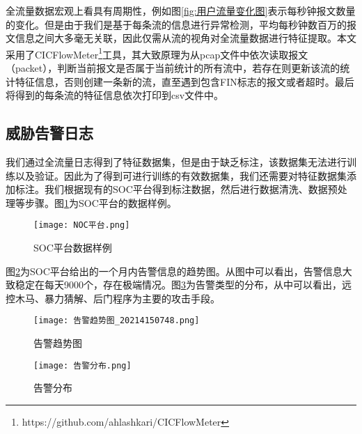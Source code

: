 全流量数据宏观上看具有周期性，例如图\ref{fig:用户流量变化图}表示每秒钟报文数量的变化。但是由于我们是基于每条流的信息进行异常检测，平均每秒钟数百万的报文信息之间大多毫无关联，因此仅需从流的视角对全流量数据进行特征提取。本文采用了CICFlowMeter\footnote{https://github.com/ahlashkari/CICFlowMeter}工具，其大致原理为从pcap文件中依次读取报文（packet），判断当前报文是否属于当前统计的所有流中，若存在则更新该流的统计特征信息，否则创建一条新的流，直至遇到包含FIN标志的报文或者超时。最后将得到的每条流的特征信息依次打印到csv文件中。


\subsection{威胁告警日志}
我们通过全流量日志得到了特征数据集，但是由于缺乏标注，该数据集无法进行训练以及验证。因此为了得到可进行训练的有效数据集，我们还需要对特征数据集添加标注。我们根据现有的SOC平台得到标注数据，然后进行数据清洗、数据预处理等步骤。图\ref{fig:NOC平台数据样例}为SOC平台的数据样例。
\begin{figure}
    \centering
    \texttt{[image: NOC平台.png]}
    \caption{SOC平台数据样例}
    \label{fig:NOC平台数据样例}
  \end{figure}


图\ref{fig:告警趋势图}为SOC平台给出的一个月内告警信息的趋势图。从图中可以看出，告警信息大致稳定在每天9000个，存在极端情况。图\ref{fig:告警分布}为告警类型的分布，从中可以看出，远控木马、暴力猜解、后门程序为主要的攻击手段。
\begin{figure}
    \centering
    \texttt{[image: 告警趋势图\_20214150748.png]}
    \caption{告警趋势图}
    \label{fig:告警趋势图}
  \end{figure}
  \begin{figure}
    \centering
    \texttt{[image: 告警分布.png]}
    \caption{告警分布}
    \label{fig:告警分布}
  \end{figure}



